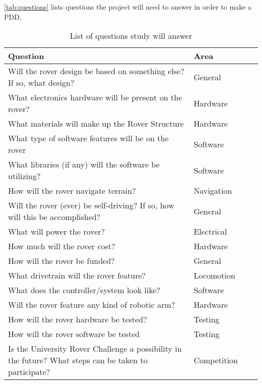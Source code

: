 \documentclass[conference]{IEEEtran} %
\begin{document}
\autoref{tab:questions} lists questions the project will need to answer in order to make a PDD.

\begin{table*}
    \caption{List of questions study will answer}
    \centering
    \begin{tabular}{@{}llcc@{}}
        \toprule %
        Question & Area \\
        \midrule %
        Will the rover design be based on something else? If so, what design? & General \\
        What electronics hardware will be present on the rover? & Hardware \\
        What materials will make up the Rover Structure & Hardware \\
        What type of software features will be on the rover & Software \\
        What libraries (if any) will the software be utilizing? & Software \\ 
        How will the rover navigate terrain? & Navigation \\
        Will the rover (ever) be self-driving? If so, how will this be accomplished? & General \\
        What will power the rover? & Electrical \\
        How much will the rover cost? & Hardware \\
        How will the rover be funded? & General \\
        What drivetrain will the rover feature? & Locomotion \\
        What does the controller/system look like? & Software \\
        Will the rover feature any kind of robotic arm? & Hardware \\
        How will the rover hardware be tested? & Testing \\
        How will the rover software be tested & Testing \\
        Is the University Rover Challenge a possibility in the future? What steps can be taken to participate? & Competition \\

\end{tabular}
\end{table*}
\end{document}
